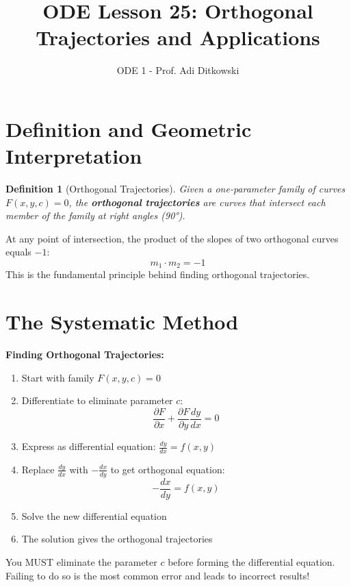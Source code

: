 \documentclass[12pt]{article}
\title{ODE Lesson 25: Orthogonal Trajectories and Applications}
\author{ODE 1 - Prof. Adi Ditkowski}
\date{}
\newtheorem{definition}{Definition}
\begin{document}
\maketitle

\section{Definition and Geometric Interpretation}

\begin{definition}[Orthogonal Trajectories]
Given a one-parameter family of curves $F(x,y,c) = 0$, the \textbf{orthogonal trajectories} are curves that intersect each member of the family at right angles (90°).
\end{definition}

\begin{keypoint}
At any point of intersection, the product of the slopes of two orthogonal curves equals $-1$:
\[m_{1} \cdot m_{2} = -1\]
This is the fundamental principle behind finding orthogonal trajectories.
\end{keypoint}

\section{The Systematic Method}

\begin{algorithm}
\textbf{Finding Orthogonal Trajectories:}
\begin{enumerate}
    \item Start with family $F(x,y,c) = 0$
    \item Differentiate to eliminate parameter $c$:
    \[\frac{\partial F}{\partial x} + \frac{\partial F}{\partial y}\frac{dy}{dx} = 0\]
    \item Express as differential equation: $\frac{dy}{dx} = f(x,y)$
    \item Replace $\frac{dy}{dx}$ with $-\frac{dx}{dy}$ to get orthogonal equation:
    \[-\frac{dx}{dy} = f(x,y)\]
    \item Solve the new differential equation
    \item The solution gives the orthogonal trajectories
\end{enumerate}
\end{algorithm}

\begin{warning}
You MUST eliminate the parameter $c$ before forming the differential equation. Failing to do so is the most common error and leads to incorrect results!
\end{warning}
\end{document}
